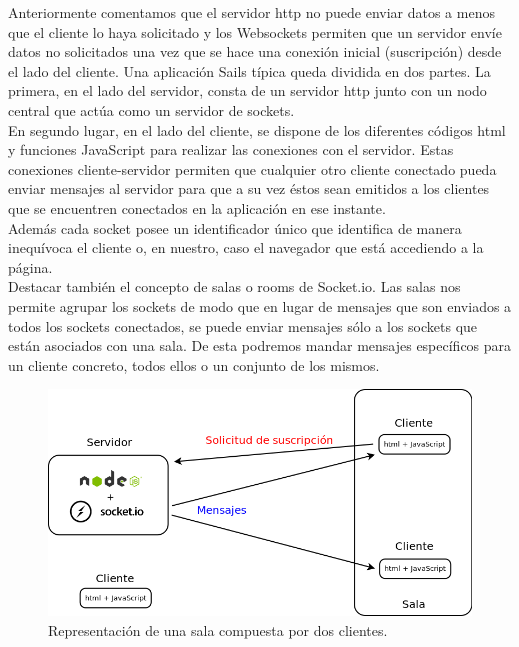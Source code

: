 Anteriormente comentamos que el servidor http no puede enviar datos a menos que el cliente lo haya solicitado y los Websockets permiten que un servidor envíe datos no solicitados una vez que se hace 
una conexión inicial (suscripción) desde el lado del cliente. Una aplicación Sails típica queda dividida en dos partes. La primera, en el lado del servidor, consta de un servidor http junto con un nodo
central que actúa como un servidor de sockets.\\ 

En segundo lugar, en el lado del cliente, se dispone de los diferentes códigos html y funciones JavaScript para realizar las conexiones con el servidor. Estas conexiones cliente-servidor permiten que 
cualquier otro cliente conectado pueda enviar mensajes al servidor para que a su vez éstos sean emitidos a los clientes que se encuentren conectados en la aplicación en ese instante.\\

Además cada socket posee un identificador único que identifica de manera inequívoca el cliente o, en nuestro, caso el navegador que está accediendo a la página.\\

Destacar también el concepto de salas o rooms de Socket.io. Las salas nos permite agrupar los sockets de modo que en lugar de mensajes que son enviados a todos los sockets conectados, se puede enviar mensajes
sólo a los sockets que están asociados con una sala. De esta podremos mandar mensajes específicos para un cliente concreto, todos ellos o un conjunto de los mismos. \\


\begin{figure}[H]
  \begin{center}
    \includegraphics[scale=0.35]{diagramas/salas-websocket.png}
  \end{center}
  \caption{Representación de una sala compuesta por dos clientes.}
  \label{view:userindex}
\end{figure}



